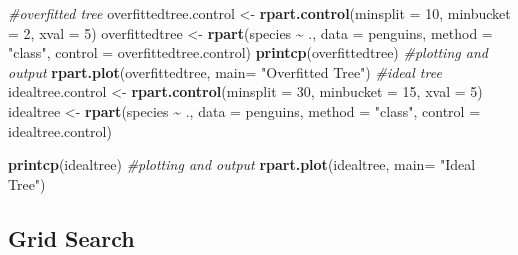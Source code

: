\documentclass[12pt]{article}
\newenvironment{Shaded}{\begin{snugshade}}{\end{snugshade}}
\newcommand{\CommentTok}[1]{\textcolor[rgb]{0.56,0.35,0.01}{\textit{#1}}}
\newcommand{\DataTypeTok}[1]{\textcolor[rgb]{0.13,0.29,0.53}{#1}}
\newcommand{\DecValTok}[1]{\textcolor[rgb]{0.00,0.00,0.81}{#1}}
\newcommand{\KeywordTok}[1]{\textcolor[rgb]{0.13,0.29,0.53}{\textbf{#1}}}
\newcommand{\NormalTok}[1]{#1}
\newcommand{\OperatorTok}[1]{\textcolor[rgb]{0.81,0.36,0.00}{\textbf{#1}}}
\newcommand{\StringTok}[1]{\textcolor[rgb]{0.31,0.60,0.02}{#1}}
\begin{document}
\begin{Shaded}
\begin{Highlighting}[]
\CommentTok{\#overfitted tree}
\NormalTok{overfittedtree.control <{-}}\StringTok{ }\KeywordTok{rpart.control}\NormalTok{(}\DataTypeTok{minsplit =} \DecValTok{10}\NormalTok{, }\DataTypeTok{minbucket =} \DecValTok{2}\NormalTok{, }
                                        \DataTypeTok{xval =} \DecValTok{5}\NormalTok{)}
\NormalTok{overfittedtree <{-}}\StringTok{ }\KeywordTok{rpart}\NormalTok{(species }\OperatorTok{\textasciitilde{}}\StringTok{ }\NormalTok{., }\DataTypeTok{data =}\NormalTok{ penguins, }\DataTypeTok{method =} \StringTok{"class"}\NormalTok{, }
                        \DataTypeTok{control =}\NormalTok{ overfittedtree.control)}
\KeywordTok{printcp}\NormalTok{(overfittedtree)}
\CommentTok{\#plotting and output}
\KeywordTok{rpart.plot}\NormalTok{(overfittedtree, }\DataTypeTok{main=} \StringTok{"Overfitted Tree"}\NormalTok{)}
\CommentTok{\#ideal tree}
\NormalTok{idealtree.control <{-}}\StringTok{ }\KeywordTok{rpart.control}\NormalTok{(}\DataTypeTok{minsplit =} \DecValTok{30}\NormalTok{, }\DataTypeTok{minbucket =} \DecValTok{15}\NormalTok{, }
                                   \DataTypeTok{xval =} \DecValTok{5}\NormalTok{)}
\NormalTok{idealtree <{-}}\StringTok{ }\KeywordTok{rpart}\NormalTok{(species }\OperatorTok{\textasciitilde{}}\StringTok{ }\NormalTok{., }\DataTypeTok{data =}\NormalTok{ penguins, }\DataTypeTok{method =} \StringTok{"class"}\NormalTok{, }
                   \DataTypeTok{control =}\NormalTok{ idealtree.control)}

\KeywordTok{printcp}\NormalTok{(idealtree)}
\CommentTok{\#plotting and output}
\KeywordTok{rpart.plot}\NormalTok{(idealtree, }\DataTypeTok{main=} \StringTok{"Ideal Tree"}\NormalTok{)}
\end{Highlighting}
\end{Shaded}

\hypertarget{grid-search}{%
\subsection{Grid Search}\label{grid-search}}
\end{document}
